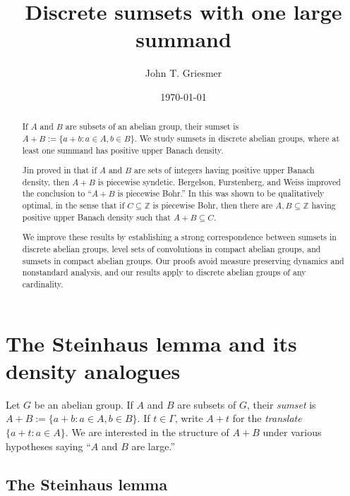 \documentclass[12pt]{amsart} \usepackage{amsmath,centernot,amssymb,leftindex}
\title[Sumsets with one large summand]{Discrete sumsets with one large summand}
\date{\today}
\author{John T. Griesmer}
\numberwithin{theorem}{section}
\numberwithin{equation}{section}
\theoremstyle{definition}
\begin{document}
	
	
	
	\begin{abstract}
		If $A$ and $B$ are subsets of an abelian group, their sumset is $A+B:=\{a+b:a\in A, b\in B\}$.  We study sumsets in discrete abelian groups, where at least one summand has positive upper Banach density. 
		
		Jin proved in \cite{Jin_SumsetPhenom} that if $A$ and $B$ are sets of integers having positive upper Banach density, then $A+B$ is piecewise syndetic.  Bergelson, Furstenberg, and Weiss \cite{BergelsonFurstenbergWeiss} improved the conclusion to ``$A+B$ is piecewise Bohr.''  In \cite{BeiglbockBergelsonFish} this was shown to be qualitatively optimal, in the sense that if $C\subseteq \mathbb Z$ is piecewise Bohr, then there are $A, B\subseteq \mathbb Z$ having positive upper Banach density such that $A+B\subseteq C$.
		
		We improve these results by establishing a strong correspondence between sumsets in discrete abelian groups, level sets of convolutions in compact abelian groups, and sumsets in compact abelian groups. Our proofs avoid measure preserving dynamics and nonstandard analysis, and our results apply to discrete abelian groups of any cardinality.
	\end{abstract}
	\maketitle
	
	\setcounter{tocdepth}{1}
	\tableofcontents
	
	\section{The Steinhaus lemma and its density analogues}
	
	Let $G$ be an abelian group. If $A$ and $B$ are subsets of $G$, their \emph{sumset} is $A+B:=\{a+b:a\in A, b\in B\}$.  If $t\in \Gamma$, write $A+t$ for the \emph{translate} $\{a+t:a\in A\}$.  We are interested in the structure of $A+B$ under various hypotheses saying ``$A$ and  $B$ are large.''  
	
	\subsection{The Steinhaus lemma}\label{sec:SteinhausReview}
	
\end{document}
